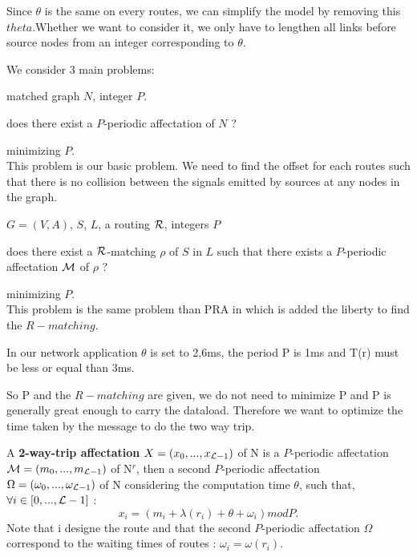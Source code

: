 \documentclass{article}
\begin{document}
Since $\theta$ is the same on every routes, we can simplify the model by removing this $theta$.Whether we want to consider it, we only have to lengthen all 
links before source nodes from an integer corresponding to $\theta$. 
 
 We consider 3 main problems:\\


 matched graph $N$, integer $P$.

 does there exist a $P$-periodic affectation of $N$ ?

 minimizing $P$.\\

This problem is our basic problem. We need to find the offset for each routes such that there is no collision between the signals emitted by sources at any nodes in the graph.\\


 $G=(V,A)$, $S$, $L$,  a routing $\cal R$, integers $P$

 does there exist  a ${\cal R}$-matching $\rho$ of $S$ in $L$ such that there exists a $P$-periodic affectation $\cal M$ of $\rho$ ?

 minimizing $P$.\\

This problem is the same problem than PRA in which is added the liberty to find the $R-matching$.

In our network application $\theta$ is set to 2,6ms, the period P is 1ms and T(r) must be less or equal than 3ms.

So P and the $R-matching$ are given, we do not need to minimize P and P is generally great enough to carry the dataload.
Therefore we want to optimize the time taken by the message to do the two way trip.

A {\bf 2-way-trip affectation} $X = (x_0,...,x_{{\cal L}-1})$ of N is a $P$-periodic affectation ${\cal M} = (m_0,...,m_{{\cal L}-1})$ of N$^r$, 
then a second $P$-periodic affectation ${\Omega} = (\omega_0,...,\omega_{{\cal L}-1}) $ of N considering the computation time $\theta$, such that, $\forall i \in [0,...,{\cal L}-1]$ :
$$ x_i = ( m_i + \lambda(r_i) + \theta + \omega_i ) mod P .$$
Note that i designe the route and that the second $P$-periodic affectation ${\Omega}$ correspond to the waiting times of routes : $\omega_i = \omega(r_i)$.
\end{document}
